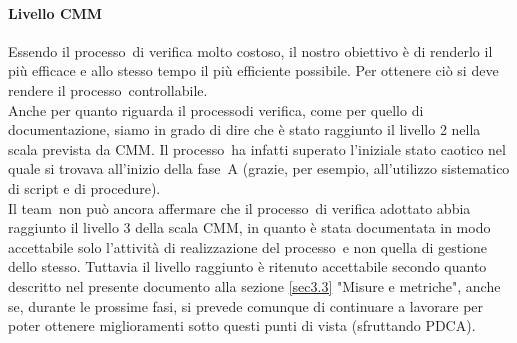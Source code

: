 \documentclass[../PianoDiQualifica.tex]{subfiles}
\begin{document}
\begin{appendices}
			\paragraph{Livello CMM}
			Essendo il processo\g\ di verifica molto costoso, il nostro obiettivo è di renderlo il più efficace e allo stesso tempo il più efficiente possibile. Per ottenere ciò si deve rendere il processo\g\ controllabile.\\
			Anche per quanto riguarda il processo\g di verifica, come per quello di documentazione, siamo in grado di dire che è stato raggiunto il livello 2 nella scala prevista da CMM\g. Il processo\g\ ha infatti superato l'iniziale stato caotico nel quale si trovava all'inizio della fase\g\ A (grazie, per esempio, all'utilizzo sistematico di script e di procedure). \\
			Il team\g\ non può ancora affermare che il processo\g\ di verifica adottato abbia raggiunto il livello 3 della scala CMM\g, in quanto è stata documentata in modo accettabile solo l'attività di realizzazione del processo\g\ e non quella di gestione dello stesso. Tuttavia il livello raggiunto è ritenuto accettabile secondo quanto descritto nel presente documento alla sezione \ref{sec3.3} "Misure e metriche", anche se, durante le prossime fasi, si prevede comunque di continuare a lavorare per poter ottenere miglioramenti sotto questi punti di vista (sfruttando PDCA\g).
\end{appendices}
\end{document}
